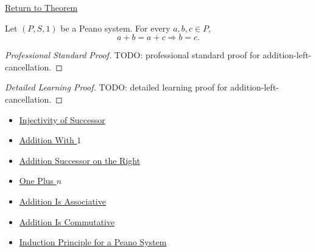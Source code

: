 \newpage
{}
\label{prf:addition-left-cancellation}

\begin{remark*}[Return]
\hyperref[thm:addition-left-cancellation]{Return to Theorem}
\end{remark*}

\begin{theorem*}
Let $(P,S,1)$ be a Peano system. For every $a,b,c \in P$,
\[
a+b=a+c
\Longrightarrow
b=c.
\]
\end{theorem*}

\begin{proof}[Professional Standard Proof]
\LRAProofBodyStart
TODO: professional standard proof for addition-left-cancellation.
\end{proof}

\begin{proof}[Detailed Learning Proof]
\LRAProofBodyStart
TODO: detailed learning proof for addition-left-cancellation.
\end{proof}

\begin{remark*}
\end{remark*}

\begin{dependencies}
\begin{itemize}
  \item \hyperref[ax:peano-successor-injective]{Injectivity of Successor}
  \item \hyperref[thm:addition-with-one]{Addition With $1$}
  \item \hyperref[thm:addition-successor-on-right]{Addition Successor on the Right}
  \item \hyperref[thm:one-plus-n]{One Plus $n$}
  \item \hyperref[thm:addition-associative]{Addition Is Associative}
  \item \hyperref[thm:addition-commutative]{Addition Is Commutative}
  \item \hyperref[thm:induction-principle-for-peano-system]{Induction Principle for a Peano System}
\end{itemize}
\end{dependencies}

\clearpage
